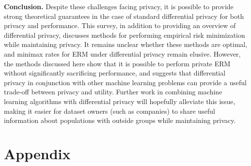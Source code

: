 \documentclass{article} %
\begin{document}
\textbf{Conclusion.} Despite these challenges facing privacy, it is possible to
provide strong theoretical guarantees in the case of standard differential
privacy for both privacy and performance. This survey, in addition to providing
an overview of differential privacy, discusses methods for performing empirical
risk minimization while maintaining privacy. It remains unclear whether these
methods are optimal, and minimax rates for ERM under differential privacy remain
elusive. However, the methods discussed here show that it is possible to perform
private ERM without significantly sacrificing performance, and suggests that
differential privacy in conjunction with other machine learning problems can
provide a useful trade-off between privacy and utility. Further work in
combining machine learning algorithms with differential privacy will hopefully
alleviate this issue, making it easier for dataset owners (such as companies) to
share useful information about populations with outside groups while maintaining
privacy.

{\small


}
\appendix
\section*{Appendix}
\end{document}
